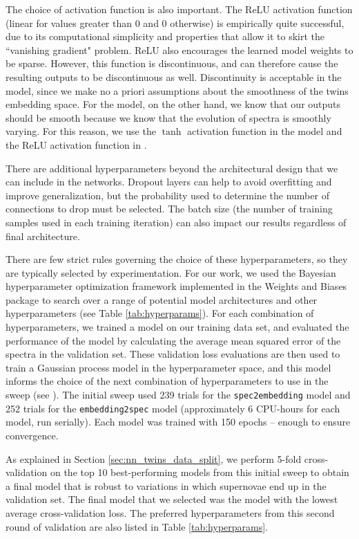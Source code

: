 The choice of activation function is also important. The ReLU activation function (linear for values greater than 0 and 0 otherwise) is empirically quite successful, due to its computational simplicity and properties that allow it to skirt the ``vanishing gradient" problem. ReLU also encourages the learned model weights to be sparse. However, this function is discontinuous, and can therefore cause the resulting outputs to be discontinuous as well. Discontinuity is acceptable in the \stoe{} model, since we make no a priori assumptions about the smoothness of the twins embedding space. For the \etos{} model, on the other hand, we know that our outputs should be smooth because we know that the evolution of spectra is smoothly varying. For this reason, we use the $\tanh$ activation function in the \etos{} model and the ReLU activation function in \stoe{}.

There are additional hyperparameters beyond the architectural design that we can include in the networks. Dropout layers \citep{srivastava_dropout_2014} can help to avoid overfitting and improve generalization, but the probability used to determine the number of connections to drop must be selected. The batch size (the number of training samples used in each training iteration) can also impact our results regardless of final architecture.

There are few strict rules governing the choice of these hyperparameters, so they are typically selected by experimentation. For our work, we used the Bayesian hyperparameter optimization framework implemented in the Weights and Biases package \citep[\texttt{wandb},][]{biewald_experiment_2020} to search over a range of potential model architectures and other hyperparameters (see Table \ref{tab:hyperparams}). For each combination of hyperparameters, we trained a model on our training data set, and evaluated the performance of the model by calculating the average mean squared error of the spectra in the validation set. These validation loss evaluations are then used to train a Gaussian process model in the hyperparameter space, and this model informs the choice of the next combination of hyperparameters to use in the sweep (see \citet{snoek_practical_2012}). The initial sweep used 239 trials for the \verb|spec2embedding| model and 252 trials for the \verb|embedding2spec| model (approximately 6 CPU-hours for each model, run serially). Each model was trained with 150 epochs -- enough to ensure convergence.

As explained in Section \ref{sec:nn_twins_data_split}, we perform 5-fold cross-validation on the top 10 best-performing models from this initial sweep to obtain a final model that is robust to variations in which supernovae end up in the validation set. The final model that we selected was the model with the lowest average cross-validation loss. The preferred hyperparameters from this second round of validation are also listed in Table \ref{tab:hyperparams}.

